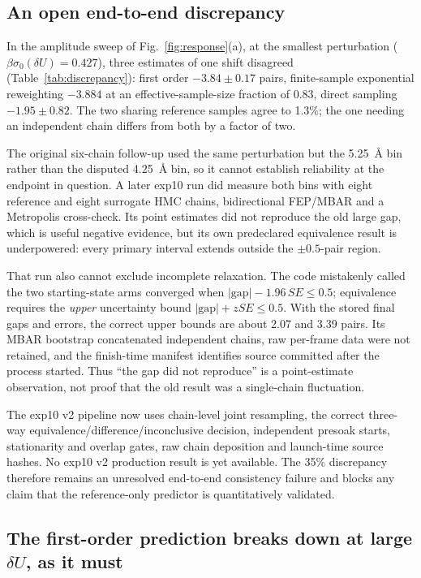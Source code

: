 \documentclass[aip,jcp,reprint,amsmath,amssymb,floatfix]{revtex4-2}
\newcommand{\dU}{\ensuremath{\delta U}}
\begin{document}
\subsection{An open end-to-end discrepancy}
\label{sec:discrepancy}

In the amplitude sweep of Fig.~\ref{fig:response}(a), at the smallest
perturbation ($\beta\sigma_0(\dU) = 0.427$), three estimates of one shift
disagreed (Table~\ref{tab:discrepancy}): first order
$-3.84 \pm 0.17$ pairs, finite-sample exponential reweighting $-3.884$ at an
effective-sample-size fraction\cite{Kish1965} of 0.83, direct sampling
$-1.95 \pm 0.82$. The two sharing reference samples agree to 1.3\%; the one
needing an independent chain differs from both by a factor of two.

The original six-chain follow-up used the same perturbation but the 5.25~\AA{}
bin rather than the disputed 4.25~\AA{} bin, so it cannot establish reliability
at the endpoint in question. A later exp10 run did measure both bins with eight
reference and eight surrogate HMC chains, bidirectional FEP/MBAR and a
Metropolis cross-check. Its point estimates did not reproduce the old large gap,
which is useful negative evidence, but its own predeclared equivalence result is
underpowered: every primary interval extends outside the $\pm0.5$-pair region.

That run also cannot exclude incomplete relaxation. The code mistakenly called
the two starting-state arms converged when $|\mathrm{gap}|-1.96\,SE\le0.5$;
equivalence requires the \emph{upper} uncertainty bound
$|\mathrm{gap}|+zSE\le0.5$. With the stored final gaps and errors, the correct
upper bounds are about 2.07 and 3.39 pairs. Its MBAR bootstrap concatenated
independent chains, raw per-frame data were not retained, and the finish-time
manifest identifies source committed after the process started. Thus ``the gap
did not reproduce'' is a point-estimate observation, not proof that the old
result was a single-chain fluctuation.

The exp10 v2 pipeline now uses chain-level joint resampling, the correct three-way
equivalence/difference/inconclusive decision, independent presoak starts,
stationarity and overlap gates, raw chain deposition and launch-time source
hashes. No exp10 v2 production result is yet available. The 35\% discrepancy therefore
remains an unresolved end-to-end consistency failure and blocks any claim that
the reference-only predictor is quantitatively validated.

\subsection{The first-order prediction breaks down at large
\texorpdfstring{$\dU$}{dU}, as it must}
\label{sec:breakdown}
\end{document}
